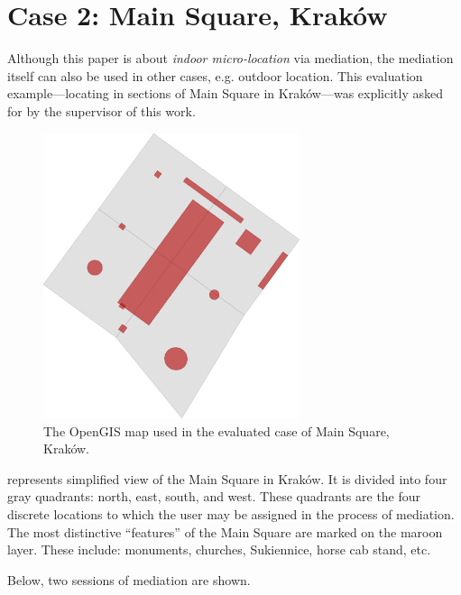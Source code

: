\section{Case 2: Main Square, Kraków}
\label{sec:case-cracow-square}

Although this paper is about \emph{indoor micro-location} via mediation, the mediation itself can also be used in other cases, e.g. outdoor location. This evaluation example---locating in sections of Main Square in Kraków---was explicitly asked for by the supervisor of this work.

\begin{figure}[b!]
	\centering
	\includegraphics[width=0.67\textwidth]{case-cracow}
	\caption{The OpenGIS map used in the evaluated case of Main Square, Kraków.}
	\label{fig:case-cracow}
\end{figure}

 represents simplified view of the Main Square in Kraków. It is divided into four gray quadrants: north, east, south, and west. These quadrants are the four discrete locations to which the user may be assigned in the process of mediation. The most distinctive ``features'' of the Main Square are marked on the maroon layer. These include: monuments, churches, Sukiennice, horse cab stand, etc.

Below, two sessions of mediation are shown.

